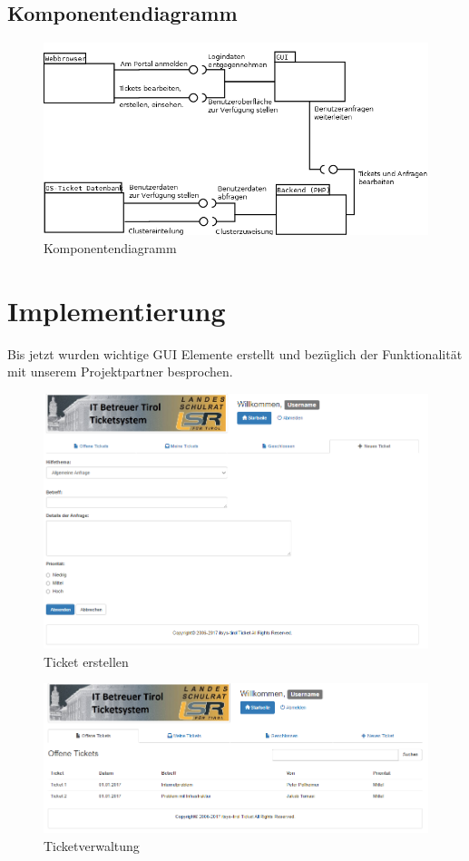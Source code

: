 	\subsection{Komponentendiagramm}
	\begin{figure}[h]
		\centering
		\includegraphics[scale=0.6]{figures/Komponentendiagramm.png}
		\caption{Komponentendiagramm}
		\label{Komponentendiagramm}
	\end{figure}

	\newpage
	\section{Implementierung}
	Bis jetzt wurden wichtige GUI Elemente erstellt und bezüglich der Funktionalität mit unserem Projektpartner besprochen.
	\begin{figure}[h]
		\centering
		\includegraphics[scale=0.6]{figures/newTicket.png}
		\caption{Ticket erstellen}
		\label{Ein Ticket erstellen}
	\end{figure}
	\newpage
	\begin{figure}[h]
		\centering
		\includegraphics[scale=0.6]{figures/index.png}
		\caption{Ticketverwaltung}
		\label{Tickets verwalten}
	\end{figure}